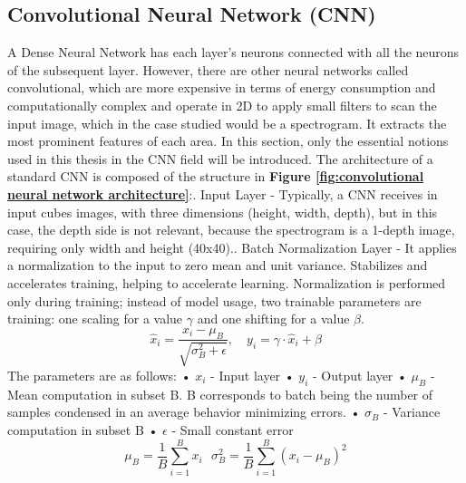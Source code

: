 \subsection{Convolutional Neural Network (CNN)}
A Dense Neural Network has each layer's neurons connected with all the neurons of the subsequent layer. However, there are other neural networks called convolutional, which are more expensive in terms of energy consumption and computationally complex and operate in 2D to apply small filters to scan the input image, which in the case studied would be a spectrogram. It extracts the most prominent features of each area.\newline 
In this section, only the essential notions used in this thesis in the CNN field will be introduced.\newline
The architecture of a standard CNN\cite{introduction_CNN} is composed of the structure in \textbf{Figure \ref{fig:convolutional neural network architecture}}:\newline{}. Input Layer - Typically, a CNN receives in input cubes images, with three dimensions (height, width, depth), but in this case, the depth side is not relevant, because the spectrogram is a 1-depth image, requiring only width and height (40x40).. Batch Normalization Layer - It applies a normalization to the input to zero mean and unit variance. Stabilizes and accelerates training, helping to accelerate learning. Normalization is performed only during training; instead of model usage, two trainable parameters are training: one scaling for a value $\gamma$ and one shifting for a value $\beta$.\newline
\begin{equation}
    \hat{x}_i = \frac{x_i - \mu_B}{\sqrt{\sigma_B^2 + \epsilon}}, \quad
    y_i = \gamma \cdot \hat{x}_i + \beta
\end{equation}
The parameters are as follows:\newline
• $x_i$ - Input layer\newline
• $y_i$ - Output layer\newline
• $\mu_B$ - Mean computation in subset B. B corresponds to batch being the number of samples condensed in an average behavior minimizing errors.\newline
• $\sigma_B$ - Variance computation in subset B\newline
• $\epsilon$ - Small constant error\newline
\begin{equation}
    \mu_B=\frac{1}{B}\sum_{i=1}^{B}x_i\,\,\,\,\sigma_B^2=\frac{1}{B}\sum_{i=1}^{B}(x_i-\mu_B)^2
\end{equation}
